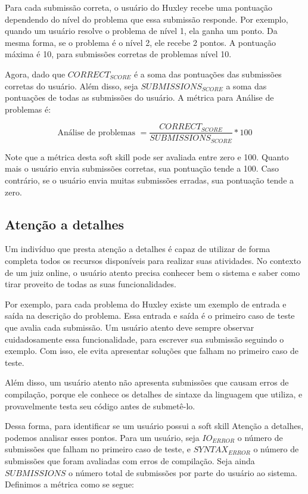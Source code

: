 Para cada submissão correta, o usuário do Huxley recebe uma pontuação dependendo do nível do problema que essa submissão responde. Por exemplo, quando um usuário resolve o problema de nível 1, ela ganha um ponto. Da mesma forma, se o problema é o nível 2, ele recebe 2 pontos. A pontuação máxima é 10, para submissões corretas de problemas nível 10.

Agora, dado que $CORRECT_{SCORE}$ é a soma das pontuações das submissões corretas do usuário. Além disso, seja $SUBMISSIONS_{SCORE}$ a soma das pontuações de todas as submissões do usuário. A métrica para Análise de problemas é:

\begin{equation} \label{m:analise}
\mbox{Análise de problemas } = \frac{CORRECT_{SCORE}}{SUBMISSIONS_{SCORE}} * 100
\end{equation}

Note que a métrica desta soft skill pode ser avaliada entre zero e 100. Quanto mais o usuário envia submissões corretas, sua pontuação tende a 100. Caso contrário, se o usuário envia muitas submissões erradas, sua pontuação tende a zero.

\subsection{Atenção a detalhes}

Um indivíduo que presta atenção a detalhes é capaz de utilizar de forma completa todos os recursos disponíveis para realizar suas atividades. No contexto de um juiz online, o usuário atento precisa conhecer bem o sistema e saber como tirar proveito de todas as suas funcionalidades.

Por exemplo, para cada problema do Huxley existe um exemplo de entrada e saída na descrição do problema. Essa entrada e saída é o primeiro caso de teste que avalia cada submissão. Um usuário atento deve sempre observar cuidadosamente essa funcionalidade, para escrever sua submissão seguindo o exemplo. Com isso, ele evita apresentar soluções que falham no primeiro caso de teste.

Além disso, um usuário atento não apresenta submissões que causam erros de compilação, porque ele conhece os detalhes de sintaxe da linguagem que utiliza, e provavelmente testa seu código antes de submetê-lo.

Dessa forma, para identificar se um usuário possui a soft skill Atenção a detalhes, podemos analisar esses pontos. Para um usuário, seja $IO_{ERROR}$ o número de submissões que falham no primeiro caso de teste, e $SYNTAX_{ERROR}$ o número de submissões que foram avaliadas com erros de compilação. Seja ainda $SUBMISSIONS$ o número total de submissões por parte do usuário ao sistema. Definimos a métrica como se segue:

